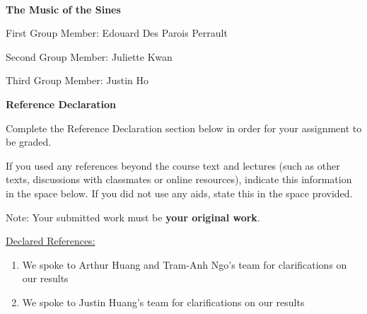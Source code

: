 \documentclass[12pt,oneside]{article}
\begin{document}
\noindent
{}

\par
\vspace{0.015in}\hrulefill\ \\
\begin{minipage}{\textwidth}
    \centering
    \vspace{0.15in}
    \Large{\bf The Music of the Sines}\par
    \vspace{0.15in}
\end{minipage}
\large{First Group Member: Edouard Des Parois Perrault}
\par
\large{Second Group Member: Juliette Kwan}
\par
\large{Third Group Member: Justin Ho}
\\

\normalsize


\textbf{Reference Declaration}

Complete the Reference Declaration section below in order for your assignment to be graded.

If you used any references beyond the course text and lectures (such as other texts, discussions with classmates or online resources), indicate this information in the space below.  If you did not use any aids, state this in the space provided. 

Note: Your submitted work must be \textbf{your original work}. 

\underline{Declared References:} \\

\begin{enumerate}
    \item We spoke to Arthur Huang and Tram-Anh Ngo's team for clarifications on
our results
    \item We spoke to Justin Huang's team for clarifications on our results
\end{enumerate}

\newpage

\partone
\end{document}
